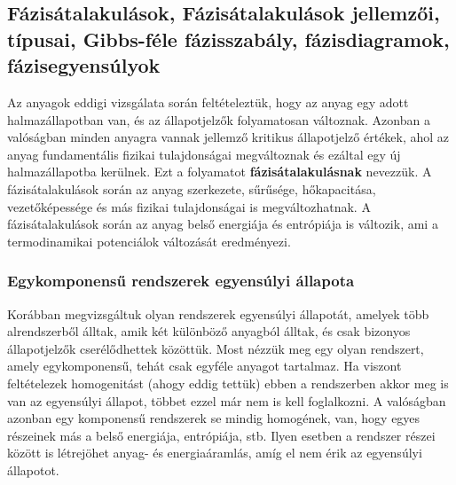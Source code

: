 \documentclass[../main.tex]{subfiles}
\begin{document}
\subsection{Fázisátalakulások, Fázisátalakulások jellemzői, típusai, Gibbs-féle fázisszabály, fázisdiagramok, fázisegyensúlyok}
Az anyagok eddigi vizsgálata során feltételeztük, hogy az anyag egy adott halmazállapotban van, és az állapotjelzők folyamatosan változnak.
Azonban a valóságban minden anyagra vannak jellemző kritikus állapotjelző értékek, ahol az anyag fundamentális fizikai tulajdonságai megváltoznak és ezáltal 
egy új halmazállapotba kerülnek. Ezt a folyamatot \textbf{fázisátalakulásnak} nevezzük. A fázisátalakulások során az anyag szerkezete, sűrűsége,
hőkapacitása, vezetőképessége és más fizikai tulajdonságai is megváltozhatnak. A fázisátalakulások során az anyag belső energiája és entrópiája is változik, ami a termodinamikai potenciálok
változását eredményezi.

\subsubsection{Egykomponensű rendszerek egyensúlyi állapota}
Korábban megvizsgáltuk olyan rendszerek egyensúlyi állapotát, amelyek több alrendszerből álltak, amik két különböző anyagból álltak, és csak
bizonyos állapotjelzők cserélődhettek közöttük. Most nézzük meg egy olyan rendszert, amely egykomponensű, tehát csak egyféle anyagot tartalmaz. 
Ha viszont feltételezek homogenitást (ahogy eddig tettük) ebben a rendszerben akkor meg is van az egyensúlyi állapot, többet ezzel már nem is kell foglalkozni.
A valóságban azonban egy komponensű rendszerek se mindig homogének, van, hogy egyes részeinek más a belső energiája, entrópiája, stb. Ilyen esetben a rendszer
részei között is létrejöhet anyag- és energiaáramlás, amíg el nem érik az egyensúlyi állapotot. 
\end{document}
